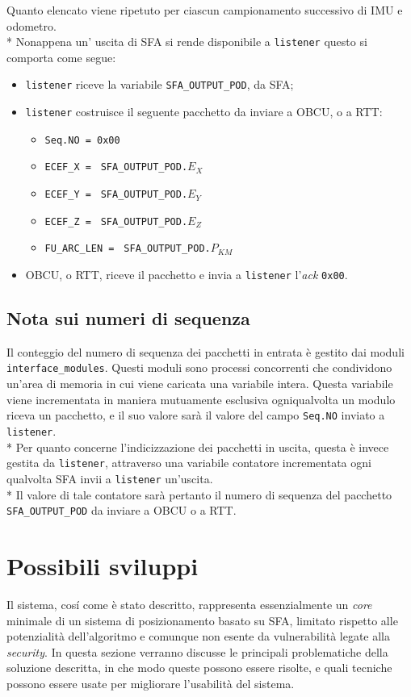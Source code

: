 Quanto elencato viene ripetuto per ciascun campionamento successivo di IMU e odometro.\\*
Nonappena un' uscita di SFA si rende disponibile a \texttt{listener} questo si comporta come segue:
\begin{itemize}
	\item \texttt{listener} riceve la variabile \texttt{SFA\_OUTPUT\_POD}, da SFA;
	\item \texttt{listener} costruisce il seguente pacchetto da inviare a OBCU, o a RTT:
		\begin{itemize}
		\item \texttt{Seq.NO = 0x00}
		\item \texttt{ECEF\_X = } \texttt{SFA\_OUTPUT\_POD.}$E_X$
		\item \texttt{ECEF\_Y = } \texttt{SFA\_OUTPUT\_POD.}$E_Y$
		\item \texttt{ECEF\_Z = } \texttt{SFA\_OUTPUT\_POD.}$E_Z$
		\item \texttt{FU\_ARC\_LEN = } \texttt{SFA\_OUTPUT\_POD.}$P_{KM}$
	\end{itemize}
	\item OBCU, o RTT, riceve il pacchetto e invia a \texttt{listener} l'\emph{ack} \texttt{0x00}.
\end{itemize}
\subsection{Nota sui numeri di sequenza}
Il conteggio del numero di sequenza dei pacchetti in entrata \`e gestito dai moduli \texttt{interface\_modules}. Questi moduli sono processi concorrenti che condividono un'area di memoria in cui viene caricata una variabile intera. Questa variabile viene incrementata in maniera mutuamente esclusiva ogniqualvolta un modulo riceva un pacchetto, e il suo valore sar\`a il valore del campo \texttt{Seq.NO} inviato a \texttt{listener}.\\*
Per quanto concerne l'indicizzazione dei pacchetti in uscita, questa \`e invece gestita da \texttt{listener}, attraverso una variabile contatore incrementata ogni qualvolta SFA invii a \texttt{listener} un'uscita.\\*
Il valore di tale contatore sar\`a pertanto il numero di sequenza del pacchetto \texttt{SFA\_OUTPUT\_POD} da inviare a OBCU o a RTT.\newpage
\section{Possibili sviluppi}
Il sistema, cos\'i come \`e stato descritto, rappresenta essenzialmente un \emph{core} minimale di un sistema di posizionamento basato su SFA, limitato rispetto alle potenzialit\`a dell'algoritmo e comunque non esente da vulnerabilit\`a legate alla \emph{security}. In questa sezione verranno discusse le principali problematiche della soluzione descritta, in che modo queste possono essere risolte, e quali tecniche possono essere usate per migliorare l'usabilit\`a del sistema.
